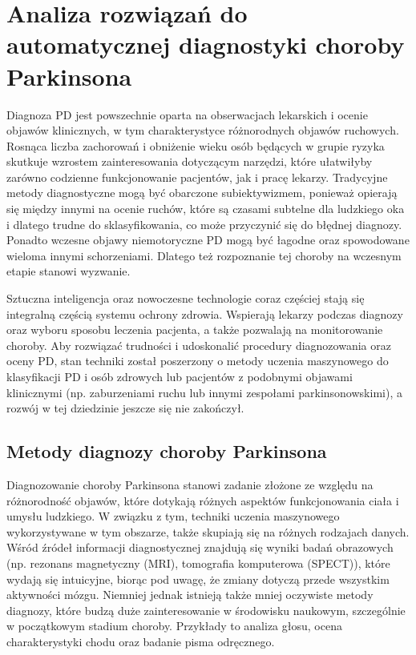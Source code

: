 \chapter{Analiza rozwiązań do automatycznej diagnostyki choroby Parkinsona}\label{ch:analiza-rozwiazan}


Diagnoza PD jest powszechnie oparta na obserwacjach lekarskich i ocenie objawów klinicznych, w tym charakterystyce różnorodnych objawów ruchowych.
Rosnąca liczba zachorowań i obniżenie wieku osób będących w grupie ryzyka skutkuje wzrostem zainteresowania dotyczącym narzędzi, które ułatwiłyby
zarówno codzienne funkcjonowanie pacjentów, jak i pracę lekarzy.
Tradycyjne metody diagnostyczne mogą być obarczone subiektywizmem, ponieważ opierają się między innymi na ocenie ruchów, które są czasami subtelne dla
ludzkiego oka i dlatego trudne do sklasyfikowania, co może przyczynić się do błędnej diagnozy.
Ponadto wczesne objawy niemotoryczne PD mogą być łagodne oraz spowodowane wieloma innymi schorzeniami.
Dlatego też rozpoznanie tej choroby na wczesnym etapie stanowi wyzwanie.

Sztuczna inteligencja oraz nowoczesne technologie coraz częściej stają się integralną częścią systemu ochrony zdrowia.
Wspierają lekarzy podczas diagnozy oraz wyboru sposobu leczenia pacjenta, a także pozwalają na monitorowanie choroby.
Aby rozwiązać trudności i udoskonalić procedury diagnozowania oraz oceny PD, stan techniki został poszerzony o metody uczenia maszynowego do
klasyfikacji PD i osób zdrowych lub pacjentów z podobnymi objawami klinicznymi (np.
zaburzeniami ruchu lub innymi zespołami parkinsonowskimi), a rozwój w tej dziedzinie jeszcze się nie zakończył.

\section{Metody diagnozy choroby Parkinsona}\label{sec:dane-przeglad}

Diagnozowanie choroby Parkinsona stanowi zadanie złożone ze względu na różnorodność objawów, które dotykają różnych aspektów
funkcjonowania ciała i umysłu ludzkiego.
W związku z tym, techniki uczenia maszynowego wykorzystywane w tym obszarze, także skupiają się na różnych rodzajach danych.
Wśród źródeł informacji diagnostycznej znajdują się wyniki badań obrazowych (np.
rezonans magnetyczny (MRI), tomografia komputerowa (SPECT)),
które wydają się intuicyjne, biorąc pod uwagę, że zmiany dotyczą przede wszystkim aktywności mózgu.
Niemniej jednak istnieją także mniej oczywiste metody diagnozy, które budzą duże zainteresowanie w środowisku naukowym, szczególnie w początkowym stadium choroby.
Przykłady to analiza głosu, ocena charakterystyki chodu oraz badanie pisma odręcznego.

